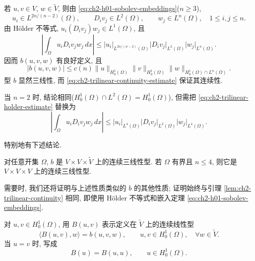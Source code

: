 \begin{Proof}
若 $u,v\in V$, $w\in\widetilde V$, 则由 \eqref{eq:ch2-h01-sobolev-embeddings}($n\geq3$),
\[
u_i\in L^{2n/(n-2)}(\Omega),
\qquad D_iv_j\in L^2(\Omega),
\qquad w_j\in L^n(\Omega),
\quad1\leq i,j\leq n.
\]
由 Hölder 不等式, $u_i(D_iv_j)w_j\in L^1(\Omega)$, 且
\begin{equation}
\left\lvert\int_\Omega u_iD_iv_jw_j\,dx\right\rvert
\leq\lvert u_i\rvert_{L^{2n/(n-2)}(\Omega)}
\lvert D_iv_j\rvert_{L^2(\Omega)}
\lvert w_j\rvert_{L^n(\Omega)}.
\label{eq:ch2-trilinear-holder-estimate}
\end{equation}
因而 $b(u,v,w)$ 有良好定义, 且
\begin{equation}
\lvert b(u,v,w)\rvert
\leq c(n)\lVert u\rVert_{H_0^1(\Omega)}
\lVert v\rVert_{H_0^1(\Omega)}
\lVert w\rVert_{H_0^1(\Omega)\cap L^n(\Omega)}.
\label{eq:ch2-trilinear-continuity-estimate}
\end{equation}
型 $b$ 显然三线性, 而 \eqref{eq:ch2-trilinear-continuity-estimate} 保证其连续性.

当 $n=2$ 时, 结论相同($H_0^1(\Omega)\cap L^2(\Omega)=H_0^1(\Omega)$), 但需把 \eqref{eq:ch2-trilinear-holder-estimate} 替换为
\begin{equation}
\left\lvert\int_\Omega u_iD_iv_jw_j\,dx\right\rvert
\leq\lvert u_i\rvert_{L^4(\Omega)}
\lvert D_iv_j\rvert_{L^2(\Omega)}
\lvert w_j\rvert_{L^4(\Omega)}.
\label{eq:ch2-trilinear-two-dimensional-estimate}
\end{equation}
\hypertarget{chapter-02-page-124}{}
\end{Proof}

特别地有下述结论.

\begin{Lemma}
\label{lem:ch2-trilinear-on-v}
对任意开集 $\Omega$, $b$ 是 $V\times V\times\widetilde V$ 上的连续三线性型. 若 $\Omega$ 有界且 $n\leq4$, 则它是 $V\times V\times V$ 上的连续三线性型.
\end{Lemma}

需要时, 我们还将证明与上述性质类似的 $b$ 的其他性质; 证明始终与引理 \ref{lem:ch2-trilinear-continuity} 相同, 即使用 Hölder 不等式和嵌入定理 \eqref{eq:ch2-h01-sobolev-embeddings}.

对 $u,v\in H_0^1(\Omega)$, 用 $B(u,v)$ 表示定义在 $\widetilde V$ 上的连续线性型
\begin{equation}
\langle B(u,v),w\rangle=b(u,v,w),
\qquad u,v\in H_0^1(\Omega),
\quad\forall w\in\widetilde V.
\label{eq:ch2-bilinear-operator-definition}
\end{equation}
当 $u=v$ 时, 写成
\begin{equation}
B(u)=B(u,u),
\qquad u\in H_0^1(\Omega).
\label{eq:ch2-nonlinear-operator-definition}
\end{equation}

